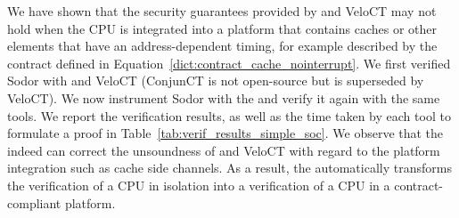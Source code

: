 We have shown that the security guarantees provided by \ucfi and VeloCT may not hold when the CPU is integrated into a platform that contains caches or other elements that have an address-dependent timing, for example described by the contract defined in Equation~\ref{dict:contract_cache_nointerrupt}.
We first verified Sodor with \ucfi and VeloCT (ConjunCT is not open-source but is superseded by VeloCT).
We now instrument Sodor with the \PICI and verify it again with the same tools.
We report the verification results, as well as the time taken by each tool to formulate a proof in Table~\ref{tab:verif_results_simple_soc}.
We observe that the \PICI indeed can correct the unsoundness of \ucfi and VeloCT with regard to the platform integration such as cache side channels.
As a result, the \PICI automatically transforms the verification of a CPU in isolation into a verification of a CPU in a contract-compliant platform.



